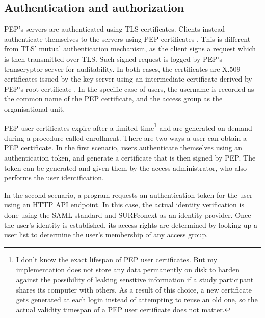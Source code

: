 \documentclass{report}
\begin{document}
\subsection{Authentication and authorization}\label{authentication_and:authorization}
PEP's servers are authenticated using TLS certificates. Clients instead authenticate themselves to the servers using PEP certificates \cite{pep-blueprint}. This is different from
TLS' mutual authentication mechanism, as the client signs a request which is then transmitted over TLS. Such signed request is logged by PEP's transcryptor server for auditability. In
both cases, the certificates are X.509 certificates \cite{X.509} issued by the key server using an intermediate certificate derived by PEP's root certificate \cite{pep-blueprint}.
In the specific case of users, the username is recorded as the common name of the PEP certificate, and the access group as the organisational unit.\par
PEP user certificates expire after a limited time\footnote{I don't know the exact lifespan of PEP user certificates. But my implementation does not store any data permanently on
disk to harden against the possibility of leaking sensitive information if a study participant shares its computer with others. As a result of this choice, a new certificate gets
generated at each login instead of attempting to reuse an old one, so the actual validity timespan of a PEP user certificate does not matter.} and are generated on-demand during a procedure called enrollment. 
There are two ways a user can obtain a PEP certificate. In the first scenario, users authenticate themselves using an authentication token, and generate a certificate that is then
signed by PEP. The token can be generated and given them by the access administrator, who also performs the user identification. \par
In the second scenario, a program requests an authentication token for the user using an HTTP API endpoint. In this case, the actual identity verification is done using the SAML 
standard \cite{sstc-saml-core-errata-2.0-wd-07} and SURFconext \cite{surfconext} as an identity provider. Once the user's identity is established, its access rights are determined by 
looking up a user list to determine the user's membership of any access group. 
\end{document}
